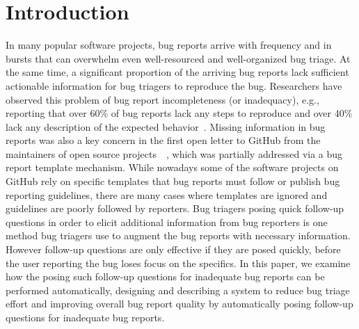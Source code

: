 \section{Introduction}

In many popular software projects, bug reports arrive with frequency and in bursts that can overwhelm even well-resourced and well-organized bug triage.
%
At the same time, a significant proportion of the arriving bug reports lack sufficient actionable information for bug triagers to reproduce the bug.
%
Researchers have observed this problem of bug report incompleteness (or inadequacy), e.g., reporting that over 60\% of bug reports lack any steps to reproduce and over 40\% lack any description of the expected behavior~\cite{chaparro17detecting}.
%
Missing information in bug reports was also a key concern in the first open letter to GitHub from the maintainers of open source projects~\cite{deargithub}~\cite{breu2010information}, which was partially addressed via a bug report template mechanism.
%
While nowadays some of the software projects on GitHub rely on specific templates that bug reports must follow or publish bug reporting guidelines, there are many cases where templates are ignored and guidelines are poorly followed by reporters.
%
Bug triagers posing quick follow-up questions in order to elicit additional information from bug reporters is one method bug triagers use to augment the bug reports with necessary information.
%
However follow-up questions are only effective if they are posed quickly, before the user reporting the bug loses focus on the specifics.
%
In this paper, we examine how the posing such follow-up questions for inadequate bug reports can be performed automatically, designing and describing a system to reduce bug triage effort and improving overall bug report quality by automatically posing follow-up questions for inadequate bug reports.

